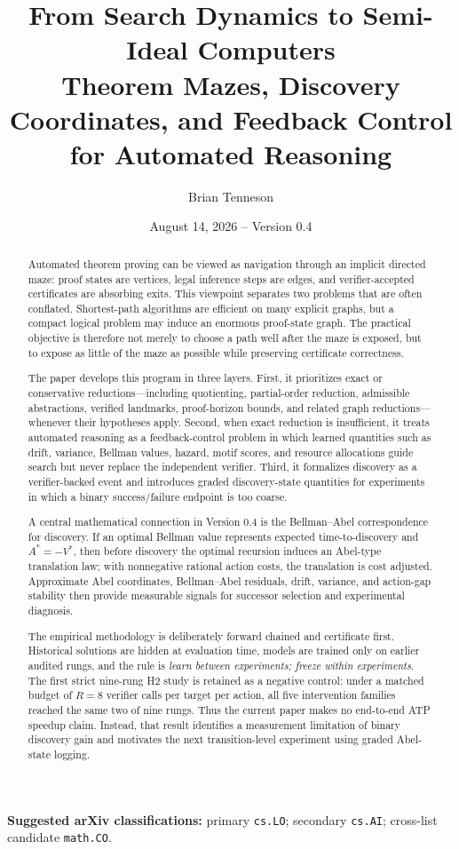 \documentclass[11pt]{article}
\title{\textbf{From Search Dynamics to Semi-Ideal Computers}\\[0.5em]
\Large Theorem Mazes, Discovery Coordinates, and Feedback Control for Automated Reasoning}
\author{Brian Tenneson}
\date{August 14, 2026 -- Version 0.4}
\theoremstyle{remark}
\begin{document}
\maketitle

\begin{center}
\textbf{Suggested arXiv classifications:} primary \texttt{cs.LO}; secondary \texttt{cs.AI}; cross-list candidate \texttt{math.CO}.
\end{center}

\begin{abstract}
Automated theorem proving can be viewed as navigation through an implicit directed maze: proof states are vertices, legal inference steps are edges, and verifier-accepted certificates are absorbing exits. This viewpoint separates two problems that are often conflated. Shortest-path algorithms are efficient on many explicit graphs, but a compact logical problem may induce an enormous proof-state graph. The practical objective is therefore not merely to choose a path well after the maze is exposed, but to expose as little of the maze as possible while preserving certificate correctness.

The paper develops this program in three layers. First, it prioritizes exact or conservative reductions---including quotienting, partial-order reduction, admissible abstractions, verified landmarks, proof-horizon bounds, and related graph reductions---whenever their hypotheses apply. Second, when exact reduction is insufficient, it treats automated reasoning as a feedback-control problem in which learned quantities such as drift, variance, Bellman values, hazard, motif scores, and resource allocations guide search but never replace the independent verifier. Third, it formalizes discovery as a verifier-backed event and introduces graded discovery-state quantities for experiments in which a binary success/failure endpoint is too coarse.

A central mathematical connection in Version 0.4 is the Bellman--Abel correspondence for discovery. If an optimal Bellman value represents expected time-to-discovery and $A^*=-V^*$, then before discovery the optimal recursion induces an Abel-type translation law; with nonnegative rational action costs, the translation is cost adjusted. Approximate Abel coordinates, Bellman--Abel residuals, drift, variance, and action-gap stability then provide measurable signals for successor selection and experimental diagnosis.

The empirical methodology is deliberately forward chained and certificate first. Historical solutions are hidden at evaluation time, models are trained only on earlier audited rungs, and the rule is \emph{learn between experiments; freeze within experiments}. The first strict nine-rung H2 study is retained as a negative control: under a matched budget of $R=8$ verifier calls per target per action, all five intervention families reached the same two of nine rungs. Thus the current paper makes no end-to-end ATP speedup claim. Instead, that result identifies a measurement limitation of binary discovery gain and motivates the next transition-level experiment using graded Abel-state logging.


\end{abstract}
\end{document}
